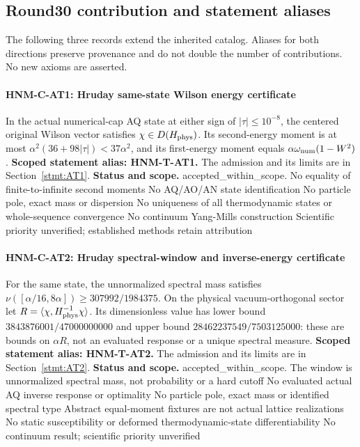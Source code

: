 \clearpage\subsection{Round30 contribution and statement aliases}
The following three records extend the inherited catalog. Aliases for both directions preserve provenance and do not double the number of contributions. No new axioms are asserted.
\paragraph{HNM-C-AT1: Hruday same-state Wilson energy certificate} In the actual numerical-cap AQ state at either sign of $|\tau|\le10^{-8}$, the centered original Wilson vector satisfies $\chi\in D(H_{\rm phys})$. Its second-energy moment is at most $\alpha^2(36+98|\tau|)<37\alpha^2$, and its first-energy moment equals $\alpha\omega_{\rm num}(1-W^2)$.
\textbf{Scoped statement alias: HNM-T-AT1.} The admission and its limits are in Section~\ref{stmt:AT1}.
\textbf{Status and scope.} accepted\_within\_scope. No equality of finite-to-infinite second moments No AQ/AO/AN state identification No particle pole, exact mass or dispersion No uniqueness of all thermodynamic states or whole-sequence convergence No continuum Yang-Mills construction Scientific priority unverified; established methods retain attribution
\paragraph{HNM-C-AT2: Hruday spectral-window and inverse-energy certificate} For the same state, the unnormalized spectral mass satisfies $\nu([\alpha/16,8\alpha])\ge307992/1984375$. On the physical vacuum-orthogonal sector let $R=\langle\chi,H_{\rm phys}^{-1}\chi\rangle$. Its dimensionless value has lower bound $3843876001/47000000000$ and upper bound $28462237549/7503125000$: these are bounds on $\alpha R$, not an evaluated response or a unique spectral measure.
\textbf{Scoped statement alias: HNM-T-AT2.} The admission and its limits are in Section~\ref{stmt:AT2}.
\textbf{Status and scope.} accepted\_within\_scope. The window is unnormalized spectral mass, not probability or a hard cutoff No evaluated actual AQ inverse response or optimality No particle pole, exact mass or identified spectral type Abstract equal-moment fixtures are not actual lattice realizations No static susceptibility or deformed thermodynamic-state differentiability No continuum result; scientific priority unverified
